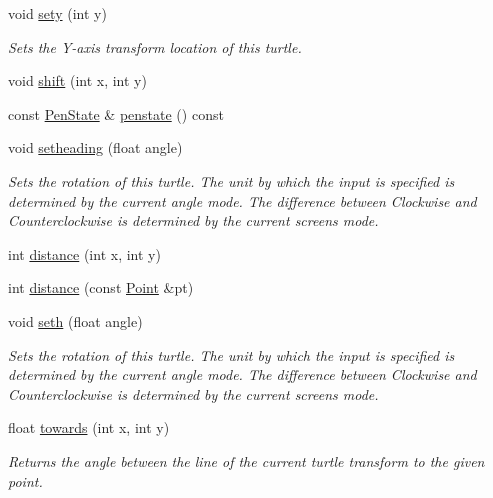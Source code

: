 \begin{DoxyCompactItemize}
\mbox{\label{classcturtle_1_1Turtle_aeee8075a33445d89a060c4faa17f9e5c}} 
void \hyperlink{classcturtle_1_1Turtle_aeee8075a33445d89a060c4faa17f9e5c}{sety} (int y)
\begin{DoxyCompactList}\small\item\em Sets the Y-\/axis transform location of this turtle. \end{DoxyCompactList}\item 
void \hyperlink{classcturtle_1_1Turtle_aea45fc1d0f00b82fc64a0f97dd6c1ea2}{shift} (int x, int y)
\item 
const \hyperlink{structcturtle_1_1PenState}{Pen\+State} \& \hyperlink{classcturtle_1_1Turtle_a2f6a16a0f4d700470bf69e0a15f3d2f4}{penstate} () const
\item 
void \hyperlink{classcturtle_1_1Turtle_a4eb2630341ea5bb922c74f214037b361}{setheading} (float angle)
\begin{DoxyCompactList}\small\item\em Sets the rotation of this turtle. The unit by which the input is specified is determined by the current angle mode. The difference between Clockwise and Counterclockwise is determined by the current screen\textquotesingle{}s mode. \end{DoxyCompactList}\item 
int \hyperlink{classcturtle_1_1Turtle_a4a6824b53f70323402d4e972f6da360c}{distance} (int x, int y)
\item 
int \hyperlink{classcturtle_1_1Turtle_aa8b64c7361639dec2eafedaf640a0ebd}{distance} (const \hyperlink{structcturtle_1_1ivec2}{Point} \&pt)
\item 
void \hyperlink{classcturtle_1_1Turtle_a2f578819830001dfb6694813f9a4aa19}{seth} (float angle)
\begin{DoxyCompactList}\small\item\em Sets the rotation of this turtle. The unit by which the input is specified is determined by the current angle mode. The difference between Clockwise and Counterclockwise is determined by the current screen\textquotesingle{}s mode. \end{DoxyCompactList}\item 
float \hyperlink{classcturtle_1_1Turtle_a1ac8961a3d5d3044b3f3f011778b51bf}{towards} (int x, int y)
\begin{DoxyCompactList}\small\item\em Returns the angle between the line of the current turtle transform to the given point. \end{DoxyCompactList}\item 

\end{DoxyCompactItemize}

